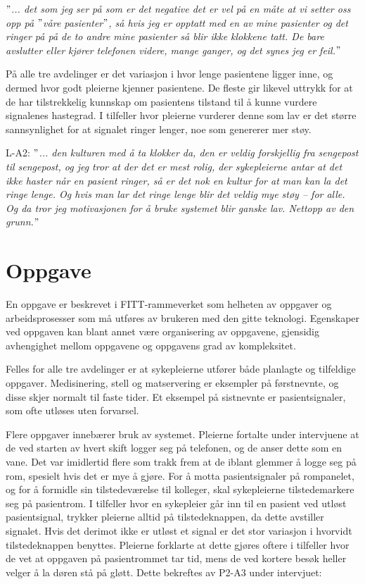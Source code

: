 \noindent
\textit{$"$... det som jeg ser på som er det negative det er vel på en måte at vi setter oss opp på $"$våre pasienter$"$, så hvis jeg er opptatt med en av mine pasienter og det ringer på på de to andre mine pasienter så blir ikke klokkene tatt. De bare avslutter eller kjører telefonen videre, mange ganger, og det synes jeg er feil.$"$}

\noindent
På alle tre avdelinger er det variasjon i hvor lenge pasientene ligger inne, og dermed hvor godt pleierne kjenner pasientene. De fleste gir likevel uttrykk for at de har tilstrekkelig kunnskap om pasientens tilstand til å kunne vurdere signalenes hastegrad. I tilfeller hvor pleierne vurderer denne som lav er det større sannsynlighet for at signalet ringer lenger, noe som genererer mer støy.
  
\noindent
L-A2: \textit{$"$... den kulturen med å ta klokker da, den er veldig forskjellig fra sengepost til sengepost, og jeg tror at der det er mest rolig, der sykepleierne antar at det ikke haster når en pasient ringer, så er det nok en kultur for at man kan la det ringe lenge. Og hvis man lar det ringe lenge blir det veldig mye støy – for alle. Og da tror jeg motivasjonen for å bruke systemet blir ganske lav. Nettopp av den grunn.$"$} 

\section{Oppgave}
En oppgave er beskrevet i FITT-rammeverket som helheten av oppgaver og arbeidsprosesser som må utføres av brukeren med den gitte teknologi. Egenskaper ved oppgaven kan blant annet være organisering av oppgavene, gjensidig avhengighet mellom oppgavene og oppgavens grad av kompleksitet.

\noindent
Felles for alle tre avdelinger er at sykepleierne utfører både planlagte og tilfeldige oppgaver. Medisinering, stell og matservering er eksempler på førstnevnte, og disse skjer normalt til faste tider. Et eksempel på sistnevnte er pasientsignaler, som ofte utløses uten forvarsel.  

\noindent
Flere oppgaver innebærer bruk av systemet. Pleierne fortalte under intervjuene at de ved starten av hvert skift logger seg på telefonen, og de anser dette som en vane. Det var imidlertid flere som trakk frem at de iblant glemmer å logge seg på rom, spesielt hvis det er mye å gjøre. For å motta pasientsignaler på rompanelet, og for å formidle sin tilstedeværelse til kolleger, skal sykepleierne tilstedemarkere seg på pasientrom. I tilfeller hvor en sykepleier går inn til en pasient ved utløst pasientsignal, trykker pleierne alltid på tilstedeknappen, da dette avstiller signalet. Hvis det derimot ikke er utløst et signal er det stor variasjon i hvorvidt tilstedeknappen benyttes. Pleierne forklarte at dette gjøres oftere i tilfeller hvor de vet at oppgaven på pasientrommet tar tid, mens de ved kortere besøk heller velger å la døren stå på gløtt.  Dette bekreftes av P2-A3 under intervjuet: 

